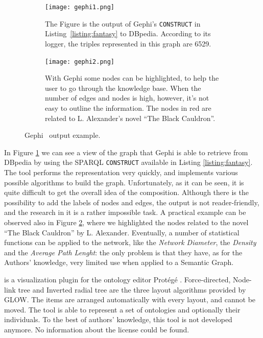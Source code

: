 \begin{description}[wide, labelindent=0pt]
\begin{figure}[!t]
    \centering
    \begin{subfigure}[b]{\textwidth}
        \texttt{[image: gephi1.png]}
        \caption{The Figure is the output of Gephi's \texttt{CONSTRUCT} in Listing~\ref{listing:fantasy} to DBpedia. According to its logger, the triples represented in this graph are 6529.}
        \label{fig:fullgraph_gephi}
    \end{subfigure}

    \begin{subfigure}[b]{\textwidth}
    \centering
        \texttt{[image: gephi2.png]}
        \caption{With Gephi some nodes can be highlighted, to help the user to go through the knowledge base. When the number of edges and nodes is high, however, it's not easy to outline the information. The nodes in red are related to L. Alexander's novel ``The Black Cauldron''.}
        \label{fig:blackcauldron}
    \end{subfigure}
    \caption{Gephi~\cite{bastian2009gephi} output example.}
    \label{fig:gephi_figs}
\end{figure}

In Figure \ref{fig:fullgraph_gephi} we can see a view of the graph that Gephi is able to retrieve from DBpedia by using the SPARQL \texttt{CONSTRUCT} available in Listing \ref{listing:fantasy}. The tool performs the representation very quickly, and implements various possible algorithms to build the graph. Unfortunately, as it can be seen, it is quite difficult to get the overall idea of the composition. Although there is the possibility to add the labels of nodes and edges, the output is not reader-friendly, and the research in it is a rather impossible task. A practical example can be observed also in Figure \ref{fig:blackcauldron}, where we highlighted the nodes related to the novel ``The Black Cauldron'' by L. Alexander. Eventually, a number of statistical functions can be applied to the network, like the \textit{Network Diameter}, the \textit{Density} and the \textit{Average Path Lenght}: the only problem is that they have, as for the Authors' knowledge, very limited use when applied to a Semantic Graph.

\item[Glow] is a visualization plugin for the ontology editor Prot\'eg\'e \cite{hop2012using}. Force-directed, Node-link tree and Inverted radial tree are the three layout algorithms provided by GLOW. The items are arranged automatically with every layout, and cannot be moved. The tool is able to represent a set of ontologies and optionally their individuals. To the best of authors' knowledge, this tool is not developed anymore. No information about the license could be found. 


\end{description}
